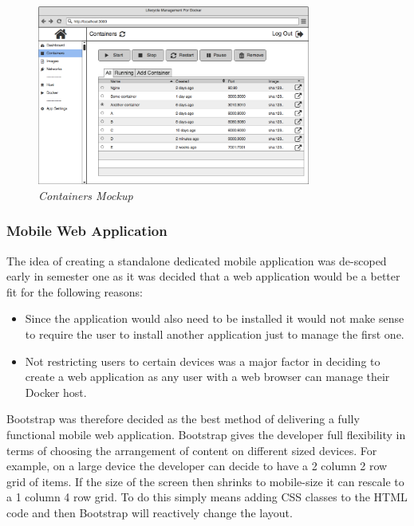 \clearpage

\begin{figure}[!ht]
\centering
\includegraphics*[width=0.8\textwidth]{wireframes/containers}
\caption{\em Containers Mockup}
\label{fig:containers_wireframe}
\end{figure}

\subsubsection{Mobile Web Application}
The idea of creating a standalone dedicated mobile application was de-scoped early in semester one as it was decided that a web application would be a better fit for the following reasons:

\begin{itemize}
	\item Since the application would also need to be installed it would not make sense to require the user to install another application just to manage the first one.
	\item Not restricting users to certain devices was a major factor in deciding to create a web application as any user with a web browser can manage their \gls{Docker host}.
\end{itemize} 

\gls{Bootstrap} was therefore decided as the best method of delivering a fully functional mobile web application. Bootstrap gives the developer full flexibility in terms of choosing the arrangement of content on different sized devices. For example, on a large device the developer can decide to have a 2 column 2 row grid of items. If the size of the screen then shrinks to mobile-size it can rescale to a 1 column 4 row grid. To do this simply means adding \gls{CSS} classes to the \gls{HTML} code and then Bootstrap will reactively change the layout.

